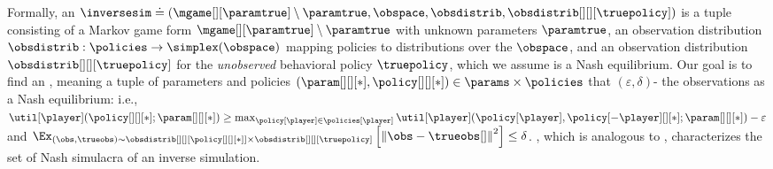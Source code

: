 Formally, an  $\inversesim \doteq (\mgame[][\paramtrue] \setminus \paramtrue, \obspace, \obsdistrib, \obsdistrib[][][\truepolicy])$ is a tuple consisting of a Markov game form $\mgame[][\paramtrue] \setminus \paramtrue$ with unknown parameters $\paramtrue$, an observation 
distribution $\obsdistrib: \policies \to \simplex (\obspace)$ mapping policies to distributions over the  $\obspace$, and an observation distribution $\obsdistrib[][][\truepolicy]$ for the \emph{unobserved\/} behavioral policy $\truepolicy$, which we assume is a Nash equilibrium.
% 
% 
% 
Our goal is to find an , meaning a tuple of parameters and policies $(\param[][][*], \policy[][][*]) \in \params \times \policies$ that $(\varepsilon, \delta)$- the observations as a Nash equilibrium: i.e., 
$\util[\player] (\policy[][][*]; \param[][][*]) \geq \max_{\policy[\player] \in \policies[\player]} \util[\player] (\policy[\player], \policy[-\player][][*]; \param[][][*]) - \varepsilon $ and $\Ex_{(\obs,\trueobs) \sim \obsdistrib[][][{\policy[][][*]}] \times \obsdistrib[][][\truepolicy]} \left[\left\|\obs - \trueobs[]\right\|^2 \right] \leq \delta$.
%
%
, which is analogous to , characterizes the set of Nash simulacra of an inverse simulation. 

